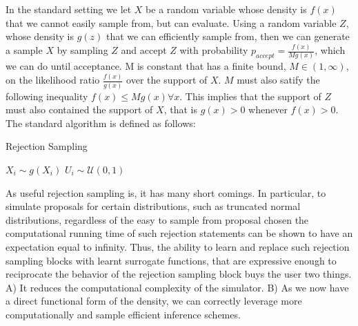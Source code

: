 \documentclass{article}
\begin{document}
In the standard setting we let $X$ be a random variable whose density is $f(x)$ that we cannot easily 
sample from, but can evaluate. Using a random variable $Z$, whose density is $g(z)$  that we can efficiently
sample from, then we can generate a sample $X$ by sampling $Z$ and accept $Z$ with probability
$p_{accept} = \frac{f(x)}{Mg(x)}$, which we can do until acceptance. 
M is constant that has a finite bound, $M \in (1, \infty)$, on the likelihood ratio $\frac{f(x)}{g(x)}$ over the 
support of $X$. $M$ must also satify the following inequality $f(x) \leq M g(x)  \forall x$. 
This implies that the support of $Z$ must also contained the support of $X$, that is
$g(x) > 0$ whenever $f(x)>0$. 
The standard algorithm is defined as follows:
\begin{algorithm}
  \small
   \caption{Rejection Sampling}
    \begin{algorithmic}\small
       \State $X_{i} \sim g(X_{i})$ 
       \State $U_{i} \sim \mathcal{U}(0,1)$
       \Else
       \EndIf
\end{algorithmic}
\end{algorithm}

As useful rejection sampling is, it has many short comings. 
In particular, to simulate proposals for certain distributions,
such as truncated normal distributions, regardless of the easy to sample from proposal
chosen the computational running time of such rejection statements can be shown to have an
expectation equal to infinity. Thus, the ability to learn and replace such rejection
sampling blocks with learnt surrogate functions, that are expressive enough to 
reciprocate the behavior of the rejection sampling block buys the user two things. 
A) It reduces the computational complexity of the simulator. 
B) As we now have a direct functional form of the density, we can correctly leverage
more computationally and sample efficient inference schemes. 
\end{document}
